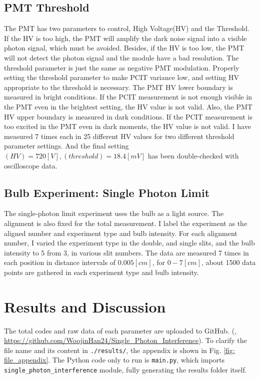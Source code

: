 \documentclass{article}
\begin{document}
\subsection{PMT Threshold}
The PMT has two parameters to control, High Voltage(HV) and the Threshold.
If the HV is too high, the PMT will amplify the dark noise signal into a visible photon signal, which must be avoided.
Besides, if the HV is too low, the PMT will not detect the photon signal and the module have a bad resolution.
The threshold parameter is just the same as negative PMT modulation.
Properly setting the threshold parameter to make PCIT variance low, and setting HV appropriate to the threshold is necessary.
The PMT HV lower boundary is measured in bright conditions.
If the PCIT measurement is not enough visible in the PMT even in the brightest setting, the HV value is not valid.
Also, the PMT HV upper boundary is measured in dark conditions.
If the PCIT measurement is too excited in the PMT even in dark moments, the HV value is not valid.
I have measured 7 times each in 25 different HV values for two different threshold parameter settings.
And the final setting $(HV) = 720 [V], (threshold) = 18.4 [mV]$ has been double-checked with oscilloscope data.

\subsection{Bulb Experiment: Single Photon Limit}
The single-photon limit experiment uses the bulb as a light source.
The alignment is also fixed for the total measurement.
I label the experiment as the aligned number and experiment type and bulb intensity.
For each alignment number, I varied the experiment type in the double, and single slits, and the bulb intensity to 5 from 3, in various slit numbers.
The data are measured 7 times in each position in distance intervals of $0.005 [cm]$, for $0 - 7 [cm]$, about 1500 data points are gathered in each experiment type and bulb intensity.

\section{Results and Discussion}
The total codes and raw data of each parameter are uploaded to GitHub.
(\cite{github}, \url{https://github.com/WoojinHan24/Single_Photon_Interference}).
To clarify the file name and its content in \verb|./results/|, the appendix is shown in Fig. \ref{fig: file_appendix}.
The Python code only to run is \verb|main.py|, which imports \verb|single_photon_interference| module, fully generating the results folder itself.
\end{document}
